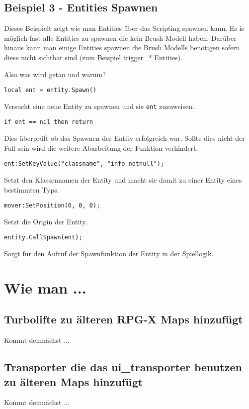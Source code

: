 \documentclass[11pt,a4paper]{book}
\begin{document}
\section{Beispiel 3 - Entities Spawnen}
Dieses Beispielt zeigt wie man Entities über das Scripting spawnen kann. Es is möglich fast alle Entities zu spawnen die kein Brush Modell haben. Darüber hinaus kann man einige Entities spawnen die Brush Modells benötigen sofern diese nicht sichtbar sind (zum Beispiel trigger\_* Entities).

\newpage
Also was wird getan und warum?
\newline
\begin{lstlisting}
local ent = entity.Spawn()
\end{lstlisting}
Versucht eine neue Entity zu spawnen und sie \lstinline|ent| zuzuweisen.
\newline
\begin{lstlisting}
if ent == nil then return
\end{lstlisting} 
Dies überprüft ob das Spawnen der Entity erfolgreich war. Sollte dies nicht der Fall sein wird die weitere Abarbeitung der Funktion verhindert.
\newline
\begin{lstlisting}
ent:SetKeyValue("classname", "info_notnull");
\end{lstlisting} 
Setzt den Klassennamen der Entity und macht sie damit zu einer Entity eines bestimmten Typs.
\newline
\begin{lstlisting}
mover:SetPosition(0, 0, 0);
\end{lstlisting} 
Setzt die Origin der Entity.
\newline
\begin{lstlisting}
entity.CallSpawn(ent);
\end{lstlisting}
Sorgt für den Aufruf der Spawnfunktion der Entity in der Spiellogik.
\chapter{Wie man ...}
\label{howto}
\section{Turbolifte zu älteren RPG-X Maps hinzufügt}
\label{howto-x2turbo}
Kommt demnächst ...
\section{Transporter die das ui\_transporter benutzen zu älteren Maps hinzufügt}
\label{howto-uitrans}
Kommt demnächst ...
\end{document}
